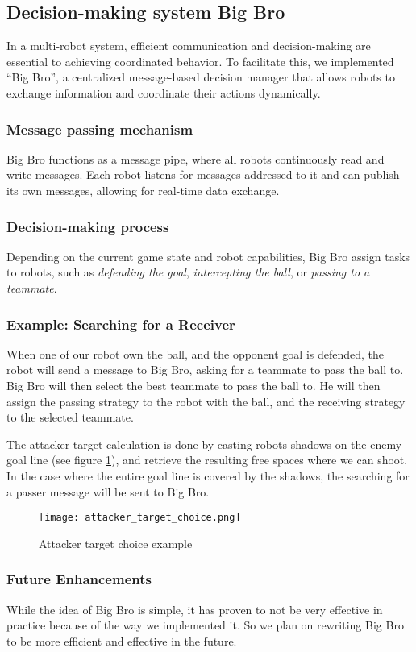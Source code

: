 \subsection{Decision-making system Big Bro}

In a multi-robot system, efficient communication and decision-making are essential to achieving coordinated behavior. To facilitate this, we implemented ``Big Bro'', a centralized message-based decision manager that allows robots to exchange information and coordinate their actions dynamically.  

\subsubsection{Message passing mechanism}

Big Bro functions as a message pipe, where all robots continuously read and write messages. Each robot listens for messages addressed to it and can publish its own messages, allowing for real-time data exchange.

\subsubsection{Decision-making process}

Depending on the current game state and robot capabilities, Big Bro assign tasks to robots, such as \textit{defending the goal}, \textit{intercepting the ball}, or \textit{passing to a teammate}.

\subsubsection{Example: Searching for a Receiver}

When one of our robot own the ball, and the opponent goal is defended, the robot will send a message to Big Bro, asking for a teammate to pass the ball to. Big Bro will then select the best teammate to pass the ball to. He will then assign the passing strategy to the robot with the ball, and the receiving strategy to the selected teammate.

The attacker target calculation is done by casting robots shadows on the enemy goal line (see figure \ref{fig:attacker_target_choice}), and retrieve the resulting free spaces where we can shoot.
In the case where the entire goal line is covered by the shadows, the searching for a passer message will be sent to Big Bro.
\begin{figure}
\centering
    \texttt{[image: attacker\_target\_choice.png]}
    \caption{Attacker target choice example}
    \label{fig:attacker_target_choice}
\end{figure}

\subsubsection{Future Enhancements}

While the idea of Big Bro is simple, it has proven to not be very effective in practice because of the way we implemented it. So we plan on rewriting Big Bro to be more efficient and effective in the future.
